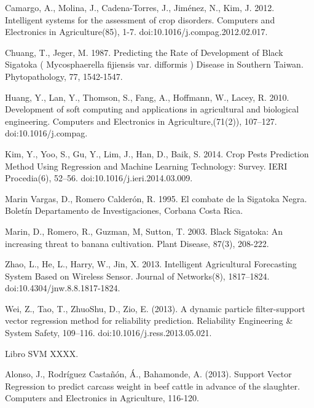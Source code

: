 \documentclass[review]{elsarticle}
\begin{document}
\begin{thebibliography}{1}


 Camargo, A., Molina, J., Cadena-Torres, J., Jim\'enez, N., Kim, J. 2012. Intelligent systems for the assessment of crop disorders. Computers and Electronics in Agriculture(85), 1-7. doi:10.1016/j.compag.2012.02.017.

 Chuang, T., Jeger, M. 1987. Predicting the Rate of Development of Black Sigatoka ( Mycosphaerella fijiensis var. difformis ) Disease in Southern Taiwan. Phytopathology, 77, 1542-1547.

 Huang, Y., Lan, Y., Thomson, S., Fang, A., Hoffmann, W., Lacey, R. 2010. Development of soft computing and applications in agricultural and biological engineering. Computers and Electronics in Agriculture,(71(2)), 107–127. doi:10.1016/j.compag.

 Kim, Y., Yoo, S., Gu, Y., Lim, J., Han, D.,  Baik, S. 2014. Crop Pests Prediction Method Using Regression and Machine Learning Technology: Survey. IERI Procedia(6), 52–56. doi:10.1016/j.ieri.2014.03.009.

 Marin Vargas, D., Romero Calderón, R. 1995. El combate de la Sigatoka Negra. Bolet\'in Departamento de Investigaciones, Corbana Costa Rica.


 Marin, D., Romero, R., Guzman, M, Sutton, T. 2003. Black Sigatoka: An increasing threat to banana cultivation. Plant Disease, 87(3), 208-222.


Zhao, L., He, L., Harry, W., Jin, X. 2013. Intelligent Agricultural Forecasting System Based on Wireless Sensor. Journal of Networks(8), 1817–1824. doi:10.4304/jnw.8.8.1817-1824.

 Wei, Z., Tao, T., ZhuoShu, D.,  Zio, E. (2013). A dynamic particle filter-support vector regression method for reliability prediction. Reliability Engineering \& System Safety, 109–116. doi:10.1016/j.ress.2013.05.021.

 Libro SVM XXXX.

 Alonso, J., Rodríguez Castañón, Á., Bahamonde, A. (2013). Support Vector Regression to predict carcass weight in beef cattle in advance of the slaughter. Computers and Electronics in Agriculture, 116-120.


\end{thebibliography}
\end{document}
